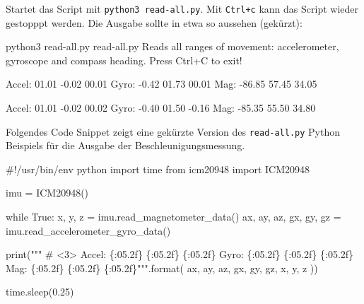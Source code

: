 \documentclass[
  11pt,
  a4paper,
  oneside, openany  ,captions=tableheading
]{scrbook}
\newenvironment{Shaded}{\begin{snugshade}}{\end{snugshade}}
\newcommand{\AttributeTok}[1]{\textcolor[rgb]{0.40,0.45,0.13}{#1}}
\newcommand{\BuiltInTok}[1]{\textcolor[rgb]{0.00,0.23,0.31}{#1}}
\newcommand{\CommentTok}[1]{\textcolor[rgb]{0.37,0.37,0.37}{#1}}
\newcommand{\ControlFlowTok}[1]{\textcolor[rgb]{0.00,0.23,0.31}{#1}}
\newcommand{\ExtensionTok}[1]{\textcolor[rgb]{0.00,0.23,0.31}{#1}}
\newcommand{\FloatTok}[1]{\textcolor[rgb]{0.68,0.00,0.00}{#1}}
\newcommand{\ImportTok}[1]{\textcolor[rgb]{0.00,0.46,0.62}{#1}}
\newcommand{\NormalTok}[1]{\textcolor[rgb]{0.00,0.23,0.31}{#1}}
\newcommand{\OperatorTok}[1]{\textcolor[rgb]{0.37,0.37,0.37}{#1}}
\newcommand{\SpecialCharTok}[1]{\textcolor[rgb]{0.37,0.37,0.37}{#1}}
\newcommand{\StringTok}[1]{\textcolor[rgb]{0.13,0.47,0.30}{#1}}
\newcommand{\VariableTok}[1]{\textcolor[rgb]{0.07,0.07,0.07}{#1}}
\theoremstyle{remark}
\newcommand*\circled[1]{\tikz[baseline=(char.base)]{
          \node[shape=circle,draw,inner sep=1pt] (char) {{\scriptsize#1}};}}
\begin{document}
Startet das Script mit \texttt{python3\ read-all.py}. Mit
\texttt{Ctrl+c} kann das Script wieder gestopppt werden. Die Ausgabe
sollte in etwa so aussehen (gekürzt):

\begin{Shaded}
\begin{Highlighting}[]
\ExtensionTok{python3}\NormalTok{ read{-}all.py}
\ExtensionTok{read{-}all.py}
\ExtensionTok{Reads}\NormalTok{ all ranges of movement: accelerometer, gyroscope and compass heading.}
\ExtensionTok{Press}\NormalTok{ Ctrl+C to exit!}

\ExtensionTok{Accel:}\NormalTok{ 01.01 }\AttributeTok{{-}0.02}\NormalTok{ 00.01}
\ExtensionTok{Gyro:}  \AttributeTok{{-}0.42}\NormalTok{ 01.73 00.01}
\ExtensionTok{Mag:}   \AttributeTok{{-}86.85}\NormalTok{ 57.45 34.05}

\ExtensionTok{Accel:}\NormalTok{ 01.01 }\AttributeTok{{-}0.02}\NormalTok{ 00.02}
\ExtensionTok{Gyro:}  \AttributeTok{{-}0.40}\NormalTok{ 01.50 }\AttributeTok{{-}0.16}
\ExtensionTok{Mag:}   \AttributeTok{{-}85.35}\NormalTok{ 55.50 34.80}
\end{Highlighting}
\end{Shaded}

Folgendes Code Snippet zeigt eine gekürzte Version des
\texttt{read-all.py} Python Beispiels für die Ausgabe der
Beschleunigungsmessung.

\label{annotated-cell-17}%
\begin{Shaded}
\begin{Highlighting}[]
\CommentTok{\#!/usr/bin/env python}
\ImportTok{import}\NormalTok{ time}
\ImportTok{from}\NormalTok{ icm20948 }\ImportTok{import}\NormalTok{ ICM20948}

\NormalTok{imu }\OperatorTok{=}\NormalTok{ ICM20948()}

\ControlFlowTok{while} \VariableTok{True}\NormalTok{:}
\NormalTok{    x, y, z }\OperatorTok{=}\NormalTok{ imu.read\_magnetometer\_data() }\hspace*{\fill}\NormalTok{\circled{1}}
\NormalTok{    ax, ay, az, gx, gy, gz }\OperatorTok{=}\NormalTok{ imu.read\_accelerometer\_gyro\_data() }\hspace*{\fill}\NormalTok{\circled{2}}

    \BuiltInTok{print}\NormalTok{(}\StringTok{""" \# \textless{}3\textgreater{}}
\StringTok{Accel: }\SpecialCharTok{\{:05.2f\}}\StringTok{ }\SpecialCharTok{\{:05.2f\}}\StringTok{ }\SpecialCharTok{\{:05.2f\}}
\StringTok{Gyro:  }\SpecialCharTok{\{:05.2f\}}\StringTok{ }\SpecialCharTok{\{:05.2f\}}\StringTok{ }\SpecialCharTok{\{:05.2f\}}
\StringTok{Mag:   }\SpecialCharTok{\{:05.2f\}}\StringTok{ }\SpecialCharTok{\{:05.2f\}}\StringTok{ }\SpecialCharTok{\{:05.2f\}}\StringTok{"""}\NormalTok{.}\BuiltInTok{format}\NormalTok{(}
\NormalTok{        ax, ay, az, gx, gy, gz, x, y, z}
\NormalTok{        ))}

\NormalTok{    time.sleep(}\FloatTok{0.25}\NormalTok{) }\hspace*{\fill}\NormalTok{\circled{4}}
\end{Highlighting}
\end{Shaded}
\end{document}
